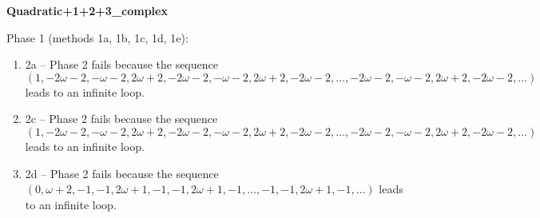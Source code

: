\begin{exmp}
\label{ex:compareAL}

\textbf{Quadratic+1+2+3\_complex}

Phase 1 (methods 1a, 1b, 1c, 1d, 1e):
\begin{enumerate}[ ]
\item  2a -- Phase 2   fails because  the sequence $(1, -2\omega - 2, -\omega - 2, 2\omega + 2, -2\omega - 2, -\omega - 2, 2\omega + 2, -2\omega - 2, \dots ,-2\omega - 2, -\omega - 2, 2\omega + 2, -2\omega - 2, \dots)$ leads to an infinite loop.
\item  2c -- Phase 2   fails because  the sequence $(1, -2\omega - 2, -\omega - 2, 2\omega + 2, -2\omega - 2, -\omega - 2, 2\omega + 2, -2\omega - 2, \dots ,-2\omega - 2, -\omega - 2, 2\omega + 2, -2\omega - 2, \dots)$ leads to an infinite loop.
\item  2d -- Phase 2   fails because  the sequence $(0, \omega + 2, -1, -1, 2\omega + 1, -1, -1, 2\omega + 1, -1, \dots ,-1, -1, 2\omega + 1, -1, \dots)$ leads to an infinite loop.
\end{enumerate}


\end{exmp}




